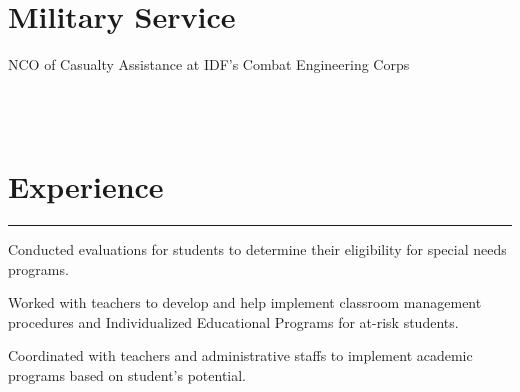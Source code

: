 \documentclass[]{rahulworld-resume}
\begin{document}
\begin{minipage}[t]{0.33\textwidth}
\section{Military Service}
NCO of Casualty Assistance at IDF's Combat Engineering Corps
\sectionsep
%
%

\end{minipage} 
\hfill
\begin{minipage}[t]{0.66\textwidth} 
\hspace*{0pt}\hfill    \\
\hspace*{0pt}\hfill    \\
\section{Experience}
\noindent\rule{12.5cm}{0.4pt}
 
\noindent
\hspace{5em}%
\begin{minipage}{0.90\textwidth\vspace{2pt}}
Conducted evaluations for students to determine their eligibility for special needs programs.

Worked with teachers to develop and help implement classroom management procedures and Individualized Educational Programs for at-risk students. 

Coordinated with teachers and administrative staffs to implement academic programs based on student’s potential.


\end{minipage}
\end{minipage}
\end{document}
